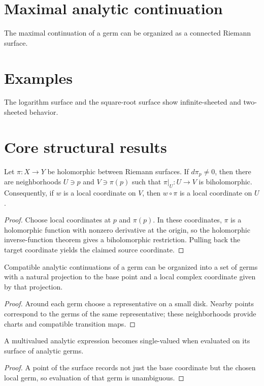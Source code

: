 \section{Maximal analytic continuation}
The maximal continuation of a germ can be organized as a connected Riemann surface.

\section{Examples}
The logarithm surface and the square-root surface show infinite-sheeted and two-sheeted behavior.

\section{Core structural results}

\begin{theorem}\label{thm:iv22-01}
Let $\pi:X\to Y$ be holomorphic between Riemann surfaces. If $d\pi_p\ne0$, then there are neighborhoods $U\ni p$ and $V\ni\pi(p)$ such that $\pi|_U:U\to V$ is biholomorphic. Consequently, if $w$ is a local coordinate on $V$, then $w\circ\pi$ is a local coordinate on $U$.
\begin{proof}
Choose local coordinates at $p$ and $\pi(p)$. In these coordinates, $\pi$ is a holomorphic function with nonzero derivative at the origin, so the holomorphic inverse-function theorem gives a biholomorphic restriction. Pulling back the target coordinate yields the claimed source coordinate.
\end{proof}
\end{theorem}

\begin{theorem}\label{thm:iv22-02}
Compatible analytic continuations of a germ can be organized into a set of germs with a natural projection to the base point and a local complex coordinate given by that projection.
\begin{proof}
Around each germ choose a representative on a small disk. Nearby points correspond to the germs of the same representative; these neighborhoods provide charts and compatible transition maps.
\end{proof}
\end{theorem}

\begin{theorem}\label{thm:iv22-03}
A multivalued analytic expression becomes single-valued when evaluated on its surface of analytic germs.
\begin{proof}
A point of the surface records not just the base coordinate but the chosen local germ, so evaluation of that germ is unambiguous.
\end{proof}
\end{theorem}

